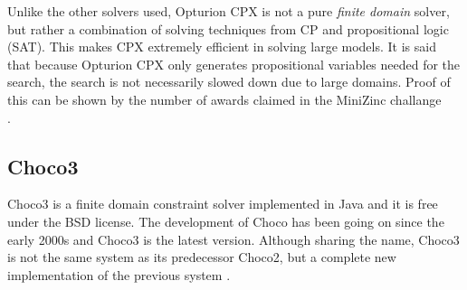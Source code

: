 Unlike the other solvers used, Opturion CPX is not a pure \emph{finite domain} solver, but rather a combination of solving techniques from CP and propositional logic (SAT). This makes CPX extremely efficient in solving large models.
It is said that because Opturion CPX only generates propositional variables needed for the search, the search is not necessarily slowed down due to large domains.
Proof of this can be shown by the number of awards claimed in the MiniZinc challange
\cite{cpx}\\
\cite{cpx_about}
\cite{cpx_site}.
\subsection{Choco3}
Choco3 is a finite domain \cite{choco_paper} constraint solver implemented in Java and it is free under the BSD license. The development of Choco has been going on since the early 2000s and Choco3 is the latest version. Although sharing the name, Choco3 is not the same system as its predecessor Choco2, but a complete new implementation of the previous system \cite{choco}.